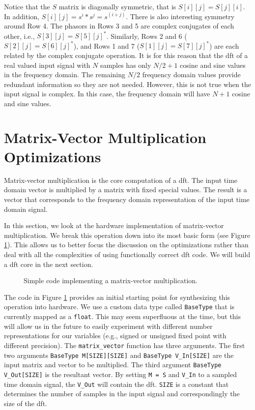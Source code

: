 Notice that the $S$ matrix is diagonally symmetric, that is $S[i][j] = S[j][i]$.  In addition, $S[i][j] = s^i*s^j = s^{(i+j)}$.  There is also interesting symmetry around Row 4. The phasors in Rows 3 and 5 are complex conjugates of each other, i.e., $S[3][j] = S[5][j]^*$. Similarly, Rows 2 and 6 ($S[2][j] = S[6][j]^*$), and Rows 1 and 7 ($S[1][j] = S[7][j]^*$) are each related by the complex conjugate operation. It is for this reason that the \gls{dft} of a real valued input signal with $N$ samples has only $N/2 + 1$ cosine and sine values in the frequency domain. The remaining $N/2$ frequency domain values provide redundant information so they are not needed. However, this is not true when the input signal is complex. In this case, the frequency domain will have $N + 1$ cosine and sine values. 

\section{Matrix-Vector Multiplication Optimizations}
\label{subsec:mvmul_implementation}

Matrix-vector multiplication is the core computation of a \gls{dft}.  The input time domain vector is multiplied by a matrix with fixed special values. The result is a vector that corresponds to the frequency domain representation of the input time domain signal.  

In this section, we look at the hardware implementation of matrix-vector multiplication. We break this operation down into its most basic form (see Figure \ref{fig:matrix_vector_base}). This allows us to better focus the discussion on the optimizations rather than deal with all the complexities of using functionally correct \gls{dft} code. We will build a \gls{dft} core in the next section. 

\begin{figure}

\caption{Simple code implementing a matrix-vector multiplication.}\label{fig:matrix_vector_base}
\end{figure}

The code in Figure \ref{fig:matrix_vector_base} provides an initial starting point for synthesizing this operation into hardware. We use a custom data type called \lstinline|BaseType| that is currently mapped as a \lstinline|float|. This may seem superfluous at the time, but this will allow us in the future to easily experiment with different number representations for our variables (e.g., signed or unsigned fixed point with different precision). The \lstinline|matrix_vector| function has three arguments. The first two arguments \lstinline|BaseType M[SIZE][SIZE]| and \lstinline|BaseType V_In[SIZE]| are the input matrix and vector to be multiplied. The third argument \lstinline|BaseType V_Out[SIZE]| is the resultant vector. By setting \lstinline|M = S|  and \lstinline|V_In| to a sampled time domain signal, the \lstinline|V_Out| will contain the \gls{dft}. \lstinline|SIZE| is a constant that determines the number of samples in the input signal and correspondingly the size of the \gls{dft}.

